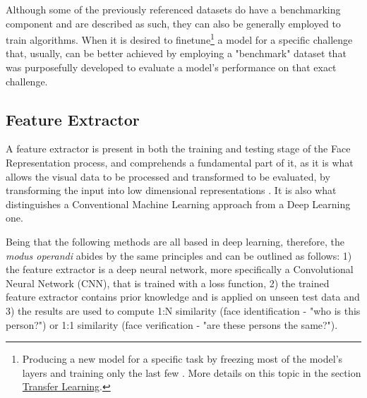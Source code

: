 \documentclass[class=report, crop=false, a4paper, 12pt]{standalone}
\begin{document}
\vspace{\baselineskip}
\par Although some of the previously referenced datasets do have a benchmarking component and are described as such, they can also be generally employed to train algorithms. When it is desired to finetune\footnote{Producing a new model for a specific task by freezing most of the model's layers and training only the last few \autocite{zhuangComprehensiveSurveyTransfer2020}. More details on this topic in the section \hyperref[transf learning]{Transfer Learning}.} a model for a specific challenge that, usually,  can be better achieved by employing a "benchmark" dataset that was purposefully developed to evaluate a model's performance on that exact challenge. 

\vspace{\baselineskip}
\centerline{
    \noindent
}

\vspace{\baselineskip}
\subsection{Feature Extractor}
A feature extractor is present in both the training and testing stage of the Face Representation process, and comprehends a fundamental part of it, as it is what allows the visual data to be processed and transformed to be evaluated, by transforming the input into low dimensional representations \autocite{lecunGradientBasedLearningApplied1998}. It is also what distinguishes a Conventional Machine Learning approach from a Deep Learning one.  
\par Being that the following methods are all based in deep learning, therefore, the \textit{modus operandi} abides by the same principles and can be outlined as follows: 1) the feature extractor is a deep neural network, more specifically a Convolutional Neural Network (CNN), that is trained with a loss function, 2) the trained feature extractor contains prior knowledge and is applied on unseen test data and 3) the results are used to compute 1:N similarity (face identification - "who is this person?") or 1:1 similarity (face verification - "are these persons the same?").
\end{document}
